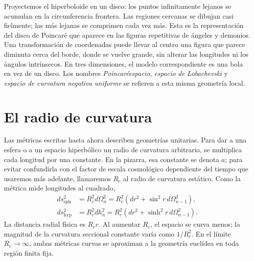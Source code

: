 Proyectemos el hiperboloide en un disco: los puntos infinitamente lejanos se acumulan en la circunferencia frontera. Las regiones cercanas se dibujan casi fielmente; las más lejanas se comprimen cada vez más. Esta es la representación del disco de Poincar\'e que aparece en las figuras repetitivas de ángeles y demonios. Una transformación de coordenadas puede llevar al centro una figura que parece diminuta cerca del borde, donde se vuelve grande, sin alterar las longitudes ni los ángulos intrínsecos. En tres dimensiones, el modelo correspondiente es una bola en vez de un disco. Los nombres \emph{Poincar\'eespacio}, \emph{espacio de Lobachevski} y \emph{espacio de curvatura negativa uniforme} se refieren a esta misma geometría local.

\begin{classroomqa}\end{classroomqa}

\section{El radio de curvatura}

Las métricas escritas hasta ahora describen geometrías unitarias. Para dar a una esfera o a un espacio hiperbólico un radio de curvatura arbitrario, se multiplica cada longitud por una constante. En la pizarra, esa constante se denota \(a\); para evitar confundirla con el factor de escala cosmológico dependiente del tiempo que usaremos más adelante, llamaremos \(R_c\) al radio de curvatura estático. Como la métrica mide longitudes al cuadrado,
\begin{align}
ds_{\mathrm{sph}}^2
  &=R_c^2d\Omega_n^2
   =R_c^2\left(dr^2+\sin^2r\,d\Omega_{n-1}^2\right),\\
ds_{\mathrm{hyp}}^2
  &=R_c^2dh_n^2
   =R_c^2\left(dr^2+\sinh^2r\,d\Omega_{n-1}^2\right).
\label{eq:c03-scaled-curvature}
\end{align}
La distancia radial física es \(R_cr\). Al aumentar \(R_c\), el espacio se curva menos; la magnitud de la curvatura seccional constante varía como \(1/R_c^2\). En el límite \(R_c\to\infty\), ambas métricas curvas se aproximan a la geometría euclídea en toda región finita fija.

